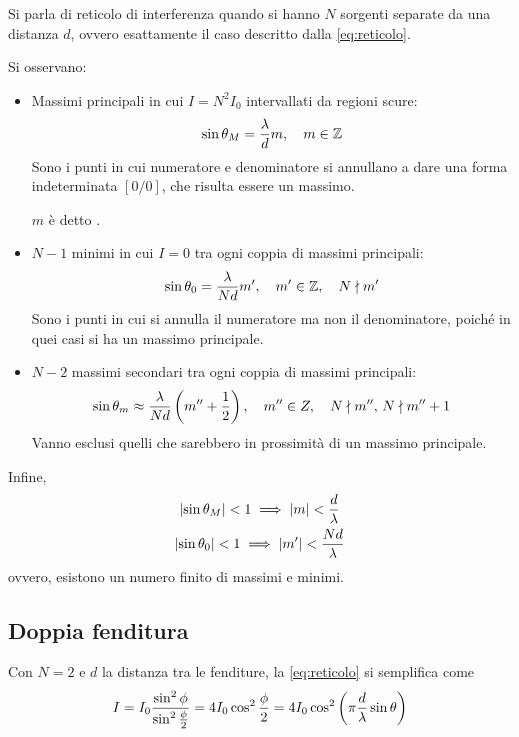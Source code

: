 Si parla di reticolo di interferenza quando si hanno $N$ sorgenti separate da una distanza $d$, ovvero esattamente il caso descritto dalla \eqref{eq:reticolo}.

Si osservano:
\begin{itemize}
    \item Massimi principali in cui $I = N^2 I_0$ intervallati da regioni scure:
        \begin{equation}
            \sin\theta_M = \frac{\lambda}{d} m, \quad m \in \mathbb{Z}
        \end{equation}
        Sono i punti in cui numeratore e denominatore si annullano a dare una forma indeterminata $[0/0]$, che risulta essere un massimo.

        $m$ è detto .
    \item $N - 1$ minimi in cui $I = 0$ tra ogni coppia di massimi principali:
        \begin{equation}
            \sin\theta_0 = \frac{\lambda}{N d} m', \quad
            m' \in \mathbb{Z}, \quad
            N \nmid m'
        \end{equation}
        Sono i punti in cui si annulla il numeratore ma non il denominatore, poiché in quei casi si ha un massimo principale.
    \item $N - 2$ massimi secondari tra ogni coppia di massimi principali:
        \begin{equation}
            \sin\theta_m \approx \frac{\lambda}{N d} \left( m'' + \frac{1}{2} \right), \quad
            m'' \in Z, \quad
            N \nmid m'', \, N \nmid m''+1
        \end{equation}
        Vanno esclusi quelli che sarebbero in prossimità di un massimo principale.
\end{itemize}

Infine,
\begin{gather}
    \left\lvert \sin\theta_M \right\rvert < 1 \implies \left\lvert m \right\rvert < \frac{d}{\lambda} \\
    \left\lvert \sin\theta_0 \right\rvert < 1 \implies \left\lvert m' \right\rvert < \frac{N d}{\lambda}
\end{gather}
ovvero, esistono un numero finito di massimi e minimi.

\subsection{Doppia fenditura}
\label{sec:doubleslit}

Con $N = 2$ e $d$ la distanza tra le fenditure, la \eqref{eq:reticolo} si semplifica come
\begin{equation}
    I = I_0 \frac{\sin^2 \phi}{\sin^2 \frac{\phi}{2}}
    = 4 I_0 \cos^2 \frac{\phi}{2}
    = 4 I_0 \cos^2 \left( \pi \frac{d}{\lambda} \sin\theta \right)
\end{equation}

